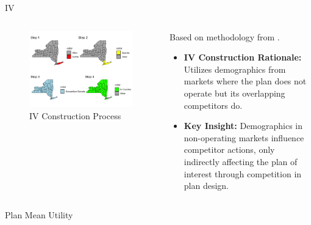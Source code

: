 \documentclass[professionalfonts, aspectratio=169]{beamer}
\begin{document}
\begin{frame}{IV}
  \begin{columns}
    \begin{column}{0.5\textwidth}
      \begin{figure}[htbp]
        \centering
        \includegraphics[width=1\textwidth]{figures/images/iv_map.png}
        \caption{IV Construction Process}
        \label{fig:IV_construction}
      \end{figure}

    \end{column}

    \begin{column}{0.5\textwidth}
      Based on methodology from \citet{fanOwnershipConsolidationProduct2013}.
      \begin{itemize}\small
          \item \textbf{IV Construction Rationale:} Utilizes demographics from markets where the plan does not operate but its overlapping competitors do.
          \item \textbf{Key Insight:} Demographics in non-operating markets influence competitor actions, only indirectly affecting the plan of interest through competition in plan design.
      \end{itemize}
      
    \end{column}
      
    
  \end{columns}
  
\end{frame}


\begin{frame}{Plan Mean Utility}
  
\end{frame}
\end{document}
